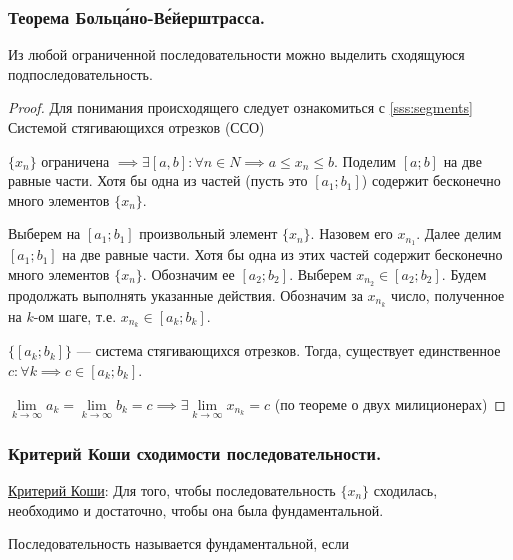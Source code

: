 \documentclass[12pt, a4paper]{article}
\begin{document}
	\subsubsection{Теорема Больц\'{а}но-В\'{е}йерштрасса.} \label{sss:bolzano}
	\begin{theorem*}
		Из любой ограниченной последовательности можно выделить сходящуюся подпоследовательность.
	\end{theorem*}
	\begin{proof}
		Для понимания происходящего следует ознакомиться с \ref{sss:segments} Системой стягивающихся отрезков (ССО)

		$\{x_n\}$ ограничена $\implies \exists [a, b]: \forall n \in N \implies a \leq x_n \leq b$. Поделим $[a; b]$ на две равные части. Хотя бы одна из частей (пусть это $[a_1; b_1]$) содержит бесконечно много элементов $\{x_n\}$.

		Выберем на $[a_1; b_1]$ произвольный элемент $\{x_n\}$. Назовем его $x_{n_1}$. Далее делим $[a_1; b_1]$ на
		две равные части. Хотя бы одна из этих частей содержит бесконечно много элементов $\{x_n\}$.
		Обозначим ее $[a_2; b_2]$. Выберем $x_{n_2} \in [a_2; b_2]$. Будем продолжать выполнять указанные действия.
		Обозначим за $x_{n_k}$ число, полученное на $k$-ом шаге, т.е. $x_{n_k} \in [a_k; b_k]$.

		$\{[a_k; b_k]\}$ --- система стягивающихся отрезков. Тогда, существует единственное $c: \forall k \implies c \in [a_k; b_k]$.

		$\lim\limits_{k \to \infty} a_k = \lim\limits_{k \to \infty} b_k = c \implies \exists \lim\limits_{k \to \infty} x_{n_k} = c$ (по теореме о двух милиционерах)
	\end{proof}

	\subsubsection{Критерий Коши сходимости последовательности.} 
	\underline{Критерий Коши}: Для того, чтобы последовательность $\{x_n\}$ сходилась, необходимо и достаточно, чтобы она была фундаментальной.

	Последовательность называется фундаментальной, если 
\end{document}
